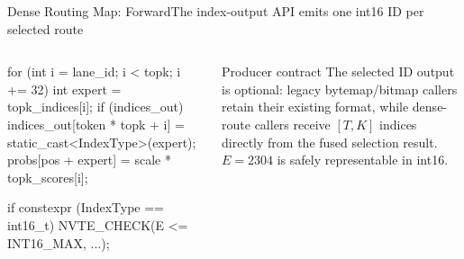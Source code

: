 \documentclass[aspectratio=169,10pt]{beamer}
\renewcommand{\NvidiaSource}[1]{}
\begin{document}
\begin{frame}[fragile]{Dense Routing Map: Forward}{The index-output API emits one int16 ID per selected route}
  \NvidiaSource{TE PR \href{https://github.com/NVIDIA/TransformerEngine/pull/3129}{\#3129};
    \texttt{TE/.../fused\_router/fused\_topk\_with\_score\_function.cu}}
  \begin{columns}[T,onlytextwidth]
    \begin{column}{.57\textwidth}
      \begin{NvidiaCode}[language=NvidiaCUDA,basicstyle=\ttfamily\fontsize{6.7}{7.9}\selectfont]
for (int i = lane_id; i < topk; i += 32) {
  int expert = topk_indices[i];
  if (indices_out)
    indices_out[token * topk + i] = static_cast<IndexType>(expert);
  probs[pos + expert] = scale * topk_scores[i];
}

if constexpr (IndexType == int16_t)
  NVTE_CHECK(E <= INT16_MAX, ...);
      \end{NvidiaCode}
    \end{column}
    \begin{column}{.38\textwidth}
      {\NvidiaSansMedium Producer contract}\NvidiaTightRule{.6pt}\vspace{.07in}
      \small The selected ID output is optional: legacy bytemap/bitmap callers retain their
      existing format, while dense-route callers receive $[T,K]$ indices directly from the
      fused selection result.
      \vspace{.10in}
      \small $E=2304$ is safely representable in int16.
    \end{column}
  \end{columns}
\end{frame}
\end{document}

